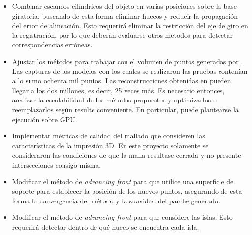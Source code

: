 \begin{itemize}
	\item Combinar escaneos cilíndricos del objeto en varias posiciones sobre la base giratoria,
		buscando de esta forma eliminar huecos y reducir la propagación del error de alineación.
		Esto requerirá eliminar la restricción del eje de giro en la
		registración, por lo que deberán evaluarse otros métodos para detectar
		correspondencias erróneas.
	\item Ajustar los métodos para trabajar con el volumen de puntos generados
		por .  Las capturas de los modelos con los cuales se
		realizaron las pruebas contenían a lo sumo ochenta mil puntos. Las
		reconstrucciones obtenidas en  pueden llegar a los
		dos millones, es decir, 25 veces más.
		Es necesario entonces, analizar la escalabilidad de los métodos
		propuestos y optimizarlos o reemplazarlos según resulte conveniente.
		En particular, puede plantearse la ejecución sobre GPU.
	\item Implementar métricas de calidad del mallado que consideren las
		características de la impresión 3D.
		En este proyecto solamente se consideraron las condiciones de que la malla
		resultase cerrada y no presente intersecciones consigo misma.
	\item Modificar el método de \emph{advancing front} para que utilice una
		superficie de soporte para establecer la posición de los nuevos puntos,
		asegurando de esta forma la convergencia del método y la suavidad del
		parche generado.
	\item Modificar el método de \emph{advancing front} para que considere las islas.
		Esto requerirá detectar dentro de qué hueco se encuentra cada isla.
\end{itemize}
